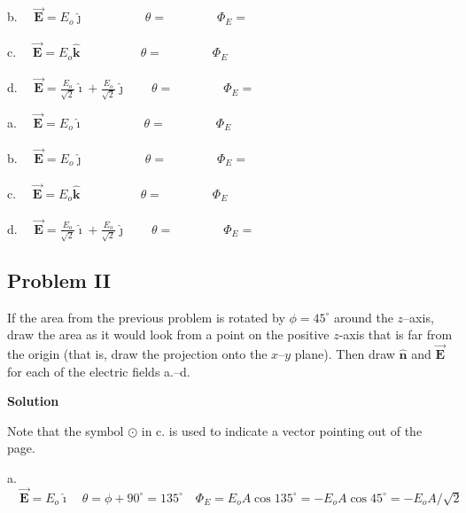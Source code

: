 \documentclass{article}
\newcommand{\ds}[0]{\displaystyle}
\newcommand{\ihat}[0]{\hat{\boldsymbol{\imath}}}
\newcommand{\jhat}[0]{\hat{\boldsymbol{\jmath}}}
\newcommand{\khat}[0]{\hat{\boldsymbol{k}}}
\newcommand{\bfvec}[1]{\vec{\mathbf{#1}}}
\begin{document}
\begin{enumerate}
        b. $\quad\ds\bfvec{E}=E_o\jhat\qquad\phantom{+ \frac{E_o}{\sqrt{2}}\jhat}\theta=\qquad\qquad\Phi_E=$ 

        c. $\quad\ds\bfvec{E}=E_o\khat\qquad\phantom{+\frac{E_o}{\sqrt{2}}\jhat}\theta=\qquad\qquad\Phi_E$ 

        d. $\quad\ds\bfvec{E}=\frac{E_o}{\sqrt{2}}\ihat + \frac{E_o}{\sqrt{2}}\jhat\qquad\theta=\qquad\qquad\Phi_E=$

        \newpage
        \fi
        \ifsolutions\else
        

          a. $\quad\ds\bfvec{E}=E_o\ihat\qquad\phantom{+\frac{E_o}{\sqrt{2}}\jhat}\theta=\qquad\qquad\Phi_E$

          b. $\quad\ds\bfvec{E}=E_o\jhat\qquad\phantom{+ \frac{E_o}{\sqrt{2}}\jhat}\theta=\qquad\qquad\Phi_E=$ 

          c. $\quad\ds\bfvec{E}=E_o\khat\qquad\phantom{+\frac{E_o}{\sqrt{2}}\jhat}\theta=\qquad\qquad\Phi_E$ 

          d. $\quad\ds\bfvec{E}=\frac{E_o}{\sqrt{2}}\ihat + \frac{E_o}{\sqrt{2}}\jhat\qquad\theta=\qquad\qquad\Phi_E=$

          \newpage
        \fi

\end{enumerate}

\subsection{Problem II}

\ifsolutions

\else


\fi
\ifsolutions\else

\fi

If the area from the previous problem is rotated by $\phi=45^\circ$ around the $z$--axis, draw the area as it would look from a point on the positive $z$-axis that is far from the origin (that is, draw the projection onto the $x$--$y$ plane). Then draw $\hat{\mathbf{n}}$ and $\bfvec{E}$ for each of the electric fields a.--d.

\ifsolutions
\textbf{Solution} 

Note that the symbol $\odot$ in c. is used to indicate a vector pointing out of the page.



a. $\quad\ds\bfvec{E}=E_o\ihat\quad\theta=\phi+90^\circ=135^\circ\quad\Phi_E=E_oA\cos 135^\circ=-E_oA\cos 45^\circ=-E_oA/\sqrt{2}$
\end{document}

